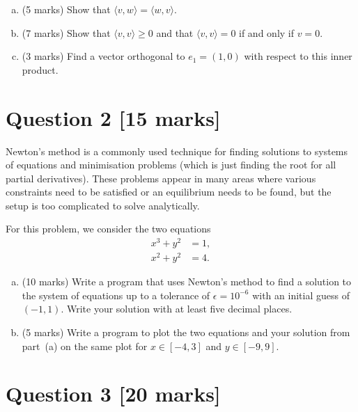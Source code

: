 \documentclass[12pt]{article}
\newcommand{\inp}[2]{\langle #1, #2 \rangle}
\begin{document}
\medskip

\begin{enumerate}[a.]
\item (5 marks) Show that $\inp{v}{w} = \inp{w}{v}$.

\item (7 marks) Show that $\inp{v}{v} \geq 0$ and that $\inp{v}{v} = 0$ if and only if $v = 0$.

\item (3 marks) Find a vector orthogonal to $e_1 = (1,0)$ with respect to this inner product.
\end{enumerate}


\clearpage

\section{\fontsize{14}{14}\selectfont Question 2 [15 marks]}

Newton's method is a commonly used technique for finding solutions to systems of equations and minimisation problems (which is just finding the root for all partial derivatives). These problems appear in many areas where various constraints need to be satisfied or an equilibrium needs to be found, but the setup is too complicated to solve analytically.

\medskip

For this problem, we consider the two equations
\begin{align*}
x^3 + y^2 & = 1,
\\ x^2 + y^2 & = 4.
\end{align*}
\begin{enumerate}[a.]
\item (10 marks) Write a program that uses Newton's method to find a solution to the system of equations up to a tolerance of $\epsilon = 10^{-6}$ with an initial guess of $(-1,1)$. Write your solution with at least five decimal places.

\item (5 marks) Write a program to plot the two equations and your solution from part~(a) on the same plot for $x \in [-4, 3]$ and $y \in [-9,9]$.
\end{enumerate}


\clearpage

\section{\fontsize{14}{14}\selectfont Question 3 [20 marks]}
\end{document}
